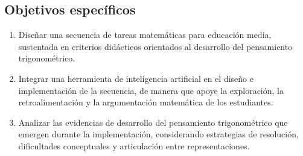 \subsection{Objetivos específicos}

\begin{enumerate}
	\item Diseñar una secuencia de tareas matemáticas para educación media, sustentada en criterios didácticos orientados al desarrollo del pensamiento trigonométrico.

	\item Integrar una herramienta de inteligencia artificial en el diseño e implementación de la secuencia, de manera que apoye la exploración, la retroalimentación y la argumentación matemática de los estudiantes.

	\item Analizar las evidencias de desarrollo del pensamiento trigonométrico que emergen durante la implementación, considerando estrategias de resolución, dificultades conceptuales y articulación entre representaciones.
\end{enumerate}
